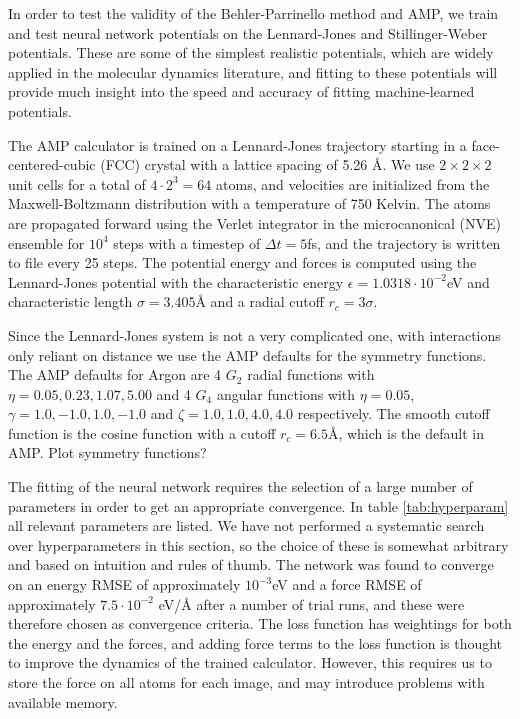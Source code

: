 In order to test the validity of the Behler-Parrinello method
and AMP, we train and test neural network potentials on the
Lennard-Jones and Stillinger-Weber potentials. These are some of
the simplest realistic potentials, which are widely applied
in the molecular dynamics literature, and fitting to these potentials
will provide much insight into the speed and accuracy of
fitting machine-learned potentials.

The AMP calculator is trained on a Lennard-Jones trajectory
starting in a face-centered-cubic (FCC) crystal
with a lattice spacing of 5.26 Å. We use $2\times2\times2$ unit
cells for a total of $4\cdot2^3 = 64$ atoms, and velocities
are initialized from the Maxwell-Boltzmann distribution
with a temperature of 750 Kelvin.
The atoms are propagated forward using the Verlet integrator
in the microcanonical (NVE) ensemble for $10^4$ steps
with a timestep of $\Delta t = 5$fs, and the trajectory
is written to file every 25 steps.
The potential energy and forces is computed using the Lennard-Jones
potential with the characteristic energy $\epsilon = 1.0318\cdot
10^{-2}$eV and characteristic length $\sigma = 3.405$Å
and a radial cutoff $r_c = 3\sigma$.
\par
Since the Lennard-Jones system is not a very complicated one,
with interactions only reliant on distance we use the AMP
defaults for the symmetry functions.
The AMP defaults for Argon are 4 $G_2$ radial functions
with $\eta = 0.05, 0.23, 1.07, 5.00$ and 4 $G_4$ angular
functions with $\eta = 0.05$, $\gamma = 1.0, -1.0, 1.0, -1.0$
and $\zeta = 1.0, 1.0, 4.0, 4.0$ respectively.
The smooth cutoff function is the cosine function
with a cutoff $r_c = 6.5$Å, which is the default in AMP.
\newline Plot symmetry functions?
\par
The fitting of the neural network requires the selection
of a large number of parameters in order to get an appropriate
convergence. In table \ref{tab:hyperparam} all relevant parameters
are listed.
We have not performed a systematic search over
hyperparameters in this section, so the choice of these is somewhat
arbitrary and based on intuition and rules of thumb.
The network was found to converge on an energy RMSE of approximately
$10^{-3}$eV and a force RMSE of approximately $7.5\cdot10^{-2}$ eV/Å
after a number of trial runs, and these were therefore chosen
as convergence criteria.
The loss function has weightings for both the energy
and the forces, and adding force terms to the loss function
is thought to improve the dynamics of the trained calculator.
However, this requires us to store the force on all atoms
for each image, and may introduce problems with available memory.

